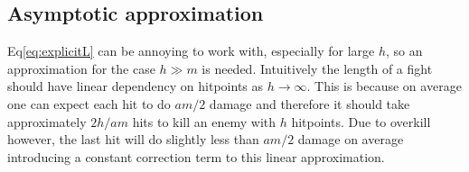\subsection{Asymptotic approximation}
Eq\ref{eq:explicitL} can be annoying to work with, especially for large $h$, so an approximation for the case $h \gg m$ is needed. Intuitively the length of a fight should have linear dependency on hitpoints as $h \rightarrow \infty$. This is because on average one can expect each hit to do $am/2$ damage and therefore it should take approximately $2h/am$ hits to kill an enemy with $h$ hitpoints. Due to overkill however, the last hit will do slightly less than $am/2$ damage on average introducing a constant correction term to this linear approximation.
